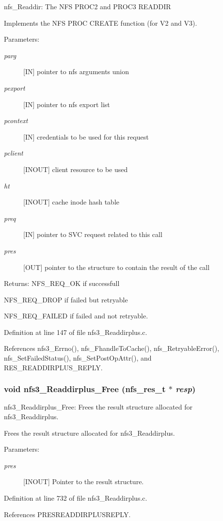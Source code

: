 nfs\_\-Readdir: The NFS PROC2 and PROC3 READDIR

Implements the NFS PROC CREATE function (for V2 and V3).

\begin{Desc}
\item[Parameters:]
\begin{description}
\item[{\em parg}][IN] pointer to nfs arguments union \item[{\em pexport}][IN] pointer to nfs export list \item[{\em pcontext}][IN] credentials to be used for this request \item[{\em pclient}][INOUT] client resource to be used \item[{\em ht}][INOUT] cache inode hash table \item[{\em preq}][IN] pointer to SVC request related to this call \item[{\em pres}][OUT] pointer to the structure to contain the result of the call\end{description}
\end{Desc}
\begin{Desc}
\item[Returns:]NFS\_\-REQ\_\-OK if successfull \par
 NFS\_\-REQ\_\-DROP if failed but retryable \par
 NFS\_\-REQ\_\-FAILED if failed and not retryable. \end{Desc}


Definition at line 147 of file nfs3\_\-Readdirplus.c.

References nfs3\_\-Errno(), nfs\_\-Fhandle\-To\-Cache(), nfs\_\-Retryable\-Error(), nfs\_\-Set\-Failed\-Status(), nfs\_\-Set\-Post\-Op\-Attr(), and RES\_\-READDIRPLUS\_\-REPLY.
\subsubsection{\setlength{\rightskip}{0pt plus 5cm}void nfs3\_\-Readdirplus\_\-Free (nfs\_\-res\_\-t $\ast$ {\em resp})}\label{nfs3__Readdirplus_8c_a3}


nfs3\_\-Readdirplus\_\-Free: Frees the result structure allocated for nfs3\_\-Readdirplus.

Frees the result structure allocated for nfs3\_\-Readdirplus.

\begin{Desc}
\item[Parameters:]
\begin{description}
\item[{\em pres}][INOUT] Pointer to the result structure. \end{description}
\end{Desc}


Definition at line 732 of file nfs3\_\-Readdirplus.c.

References PRESREADDIRPLUSREPLY.